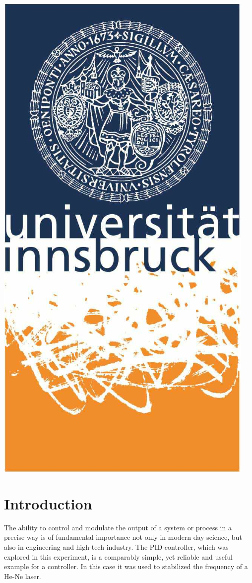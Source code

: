 \documentclass[a4paper,10pt]{article}
\begin{document}
\begin{titlepage}
	\begin{center}
	\includegraphics[scale=0.4]{img/uibk}
	\end{center}

\end{titlepage}


\section{Introduction}
The ability to control and modulate the output of a system or process in a precise way is of fundamental importance not only in modern day science, but also in engineering and high-tech industry. The PID-controller, which was explored in this experiment, is a comparably simple, yet reliable and useful example for a controller. In this case it was used to stabilized the frequency of a He-Ne laser.
\end{document}
